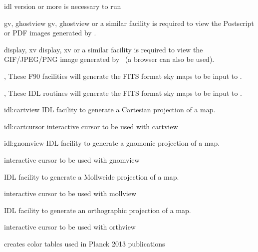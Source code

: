 \renewcommand{\projfullname}{{a Mollweide}}
\begin{codedescription}
{}
\end{codedescription}


%

\newpage
\begin{related}
  \begin{sulist}{} %
  \item[idl] version \idlversion or more is necessary to run \thedocid
  \item[gv, ghostview] gv, ghostview or a similar facility is required to view
	  the Postscript or PDF images generated by \thedocid.
  \item[display, xv] display, xv or a similar facility is required to view the
            GIF/JPEG/PNG image generated by \thedocid \ (a browser can also 
            be used).
  \item[\htmlref{synfast}{fac:synfast}, \htmlref{smoothing}{fac:smoothing}] These F90 \healpix facilities will generate the FITS format 
            sky maps to be input to \thedocid.
  \item[\htmlref{isynfast}{idl:isynfast}, \htmlref{ismoothing}{idl:ismoothing}] These IDL routines will generate the FITS format 
            sky maps to be input to \thedocid.
  \item[{\htmlref{cartview} {idl:cartview}}] 
	IDL facility to generate a Cartesian projection of
  	a \healpix map.
  \item[{\htmlref{cartcursor} {idl:cartcursor}}] 
	interactive cursor to be used with cartview
  \item[{\htmlref{gnomview} {idl:gnomview}}] 
	IDL facility to generate a gnomonic projection of
  	a \healpix map.
  \item[{\htmlref{gnomcursor}{idl:gnomcursor}}] 
	interactive cursor to be used with gnomview
  \item[{\htmlref{mollview}{idl:mollview}}] 
	IDL facility to generate a Mollweide projection of
  	a \healpix map.
  \item[{\htmlref{mollcursor}{idl:mollcursor}}] interactive cursor to be used with mollview
  \item[{\htmlref{orthview}{idl:orthview}}] 
	IDL facility to generate an orthographic projection of
  	a \healpix map.
  \item[{\htmlref{orthcursor}{idl:orthcursor}}] 
	interactive cursor to be used with orthview
  \item[{\htmlref{planck\_colors}{idl:planck_colors}}]
        creates color tables used in Planck 2013 publications
  \end{sulist}
\end{related}



